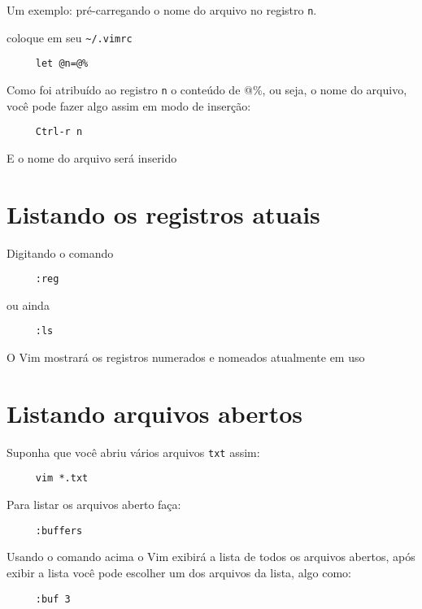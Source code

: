 Um exemplo: pré-carregando o nome do arquivo no registro \verb+n+.

coloque em seu \verb+~/.vimrc+

\begin{verbatim}
     let @n=@%
\end{verbatim}

Como foi atribuído ao registro \verb+n+ o conteúdo de @\%, ou seja, o nome
do arquivo, você pode fazer algo assim em modo de inserção:

\begin{verbatim}
     Ctrl-r n
\end{verbatim}

E o nome do arquivo será inserido

\section{Listando os registros atuais}
\label{Listando os registros atuais}
Digitando o comando

\begin{verbatim}
     :reg
\end{verbatim}

ou ainda

\begin{verbatim}
     :ls
\end{verbatim}

O Vim mostrará os registros numerados e nomeados atualmente em uso

\section{Listando arquivos abertos}
\label{Listando arquivos abertos}
Suponha que você abriu vários arquivos {\tt txt} assim:

\begin{verbatim}
     vim *.txt
\end{verbatim}

Para listar os arquivos aberto faça:

\begin{verbatim}
     :buffers
\end{verbatim}

Usando o comando acima o Vim exibirá a lista de todos os arquivos
abertos, após exibir a lista você pode escolher um dos arquivos da
lista, algo como:

\begin{verbatim}
     :buf 3
\end{verbatim}

